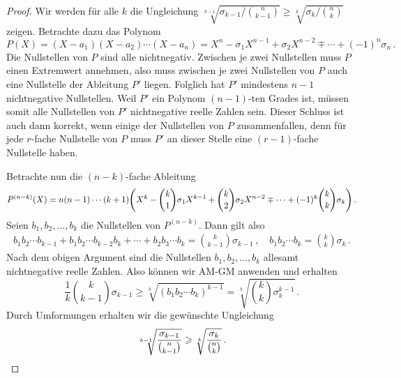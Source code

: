 \begin{proof}
	Wir werden für alle $k$ die Ungleichung $\sqrt[k-1]{\sigma_{k-1}/\binom{n}{k-1}}\geqslant \sqrt[k]{\sigma_k/\binom{n}{k}}$ zeigen. Betrachte dazu das Polynom
	\begin{equation*}
		P(X)=(X-a_1)(X-a_2)\dotsm (X-a_n)=X^n-\sigma_1 X^{n-1}+\sigma_2 X^{n-2}\mp\dotsb+(-1)^n\sigma_n\,.
	\end{equation*}
	Die Nullstellen von $P$ sind alle nichtnegativ. Zwischen je zwei Nullstellen muss $P$ einen Extremwert annehmen, also muss zwischen je zwei Nullstellen von $P$ auch eine Nullstelle der Ableitung $P'$ liegen. Folglich hat $P'$ mindestens $n-1$ nichtnegative Nullstellen. Weil $P'$ ein Polynom $(n-1)$-ten Grades ist, müssen somit alle Nullstellen von $P'$ nichtnegative reelle Zahlen sein. Dieser Schluss ist auch dann korrekt, wenn einige der Nullstellen von $P$ zusammenfallen, denn für jede $r$-fache Nullstelle von $P$ muss $P'$ an dieser Stelle eine $(r-1)$-fache Nullstelle haben.
	
	Betrachte nun die $(n-k)$-fache Ableitung
	\begin{equation*}
		P^{(n-k)}(X)=n(n-1)\dotsm (k+1)\parens*{X^k-\binom{k}{1}\sigma_1 X^{k-1}+\binom{k}{2}\sigma_2 X^{n-2}\mp\dotsb+(-1)^{k}\binom{k}{k}\sigma_k}\,.
	\end{equation*}
	Seien $b_1,b_2,\dotsc,b_k$ die Nullstellen von $P^{(n-k)}$. Dann gilt also
	\begin{align*}
		b_1b_2\dotsm b_{k-1}+b_1b_2\dotsm b_{k-2}b_k+\dotsb+b_2b_3\dotsm b_k=\binom{k}{k-1}\sigma_{k-1}\,,\quad b_1b_2\dotsm b_k= \binom{k}{k}\sigma_k\,.
	\end{align*}
	Nach dem obigen Argument sind die Nullstellen $b_1,b_2,\dotsc,b_k$ allesamt nichtnegative reelle Zahlen. Also können wir AM-GM anwenden und erhalten
	\begin{equation*}
		\frac{1}{k}\binom{k}{k-1}\sigma_{k-1}\geqslant \sqrt[k]{(b_1b_2\dotsm b_k)^{k-1}}=\sqrt[k]{\binom{k}{k}\sigma_k^{k-1}}\,.
	\end{equation*}
	Durch Umformungen erhalten wir die gewünschte Ungleichung
	\begin{equation*}
		\sqrt[k-1]{\frac{\sigma_{k-1}}{\binom{n}{k-1}}}\geqslant \sqrt[k]{\frac{\sigma_k}{\binom{n}{k}}}\,.\qedhere
	\end{equation*}
\end{proof}

